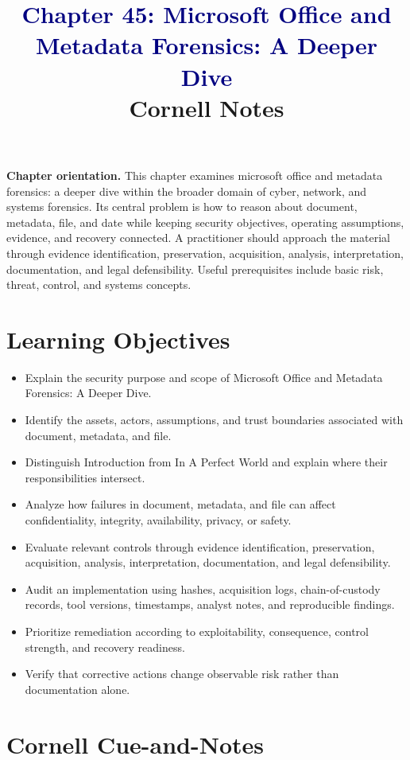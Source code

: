 \documentclass[11pt]{article}
\title{\textcolor{Navy}{Chapter 45: Microsoft Office and Metadata Forensics: A Deeper Dive}\\[2mm]\large Cornell Notes}
\author{}
\date{}
\begin{document}
\maketitle
\thispagestyle{fancy}
\vspace{-1.5em}
\begin{orientationbox}
\textbf{Chapter orientation.} This chapter examines microsoft office and metadata forensics: a deeper dive within the broader domain of cyber, network, and systems forensics. Its central problem is how to reason about document, metadata, file, and date while keeping security objectives, operating assumptions, evidence, and recovery connected. A practitioner should approach the material through evidence identification, preservation, acquisition, analysis, interpretation, documentation, and legal defensibility. Useful prerequisites include basic risk, threat, control, and systems concepts.
\end{orientationbox}
\section*{Learning Objectives}
\begin{itemize}
\item Explain the security purpose and scope of Microsoft Office and Metadata Forensics: A Deeper Dive.
\item Identify the assets, actors, assumptions, and trust boundaries associated with document, metadata, and file.
\item Distinguish Introduction from In A Perfect World and explain where their responsibilities intersect.
\item Analyze how failures in document, metadata, and file can affect confidentiality, integrity, availability, privacy, or safety.
\item Evaluate relevant controls through evidence identification, preservation, acquisition, analysis, interpretation, documentation, and legal defensibility.
\item Audit an implementation using hashes, acquisition logs, chain-of-custody records, tool versions, timestamps, analyst notes, and reproducible findings.
\item Prioritize remediation according to exploitability, consequence, control strength, and recovery readiness.
\item Verify that corrective actions change observable risk rather than documentation alone.
\end{itemize}
\section*{Cornell Cue-and-Notes}
\end{document}
